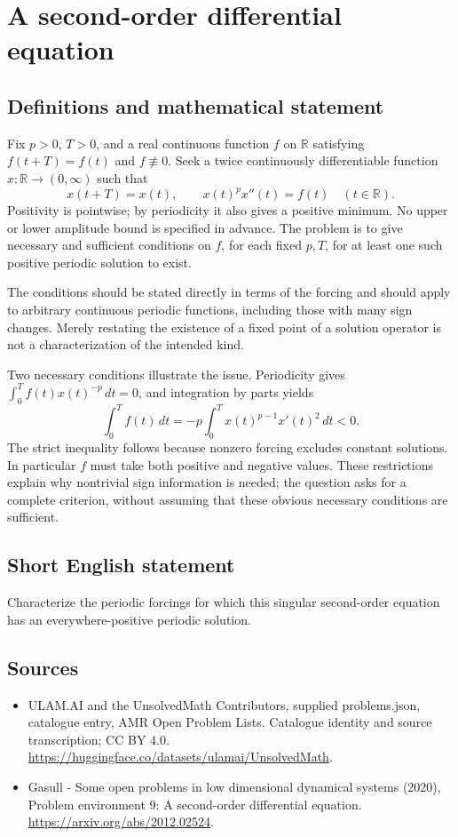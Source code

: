 \documentclass[11pt,a4paper]{article}
\begin{document}
\section*{A second-order differential equation}\label{statement}

\subsection{Definitions and mathematical statement}
Fix $p>0$, $T>0$, and a real continuous function $f$ on $\mathbb R$ satisfying
$f(t+T)=f(t)$ and $f\not\equiv0$. Seek a twice continuously differentiable
function $x:\mathbb R\to(0,\infty)$ such that
\[
 x(t+T)=x(t),\qquad x(t)^p x''(t)=f(t)
 \quad(t\in\mathbb R).
\]
Positivity is pointwise; by periodicity it also gives a positive minimum.
No upper or lower amplitude bound is specified in advance. The problem is
to give necessary and sufficient conditions on $f$, for each fixed $p,T$,
for at least one such positive periodic solution to exist.

The conditions should be stated directly in terms of the forcing and should
apply to arbitrary continuous periodic functions, including those with many
sign changes. Merely restating the existence of a fixed point of a solution
operator is not a characterization of the intended kind.

Two necessary conditions illustrate the issue. Periodicity gives $\int_0^T f(t)x(t)^{-p}\,dt=0$, and integration by parts yields
\[
 \int_0^T f(t)\,dt=-p\int_0^T x(t)^{p-1}x'(t)^2\,dt<0.
\]
The strict inequality follows because nonzero forcing excludes constant
solutions. In particular $f$ must take both positive and negative values.
These restrictions explain why nontrivial sign information is needed; the
question asks for a complete criterion, without assuming that these obvious
necessary conditions are sufficient.
\subsection{Short English statement}
Characterize the periodic forcings for which this singular second-order equation has an everywhere-positive periodic solution.
\subsection{Sources}
\begin{itemize}
\item[S1] ULAM.AI and the UnsolvedMath Contributors, supplied problems.json, catalogue entry, AMR Open Problem Lists. Catalogue identity and source transcription; CC BY 4.0.
\url{https://huggingface.co/datasets/ulamai/UnsolvedMath}.
\item[S2] Gasull - Some open problems in low dimensional dynamical systems (2020), Problem environment 9: A second-order differential equation. 
\url{https://arxiv.org/abs/2012.02524}.
\end{itemize}
\end{document}
